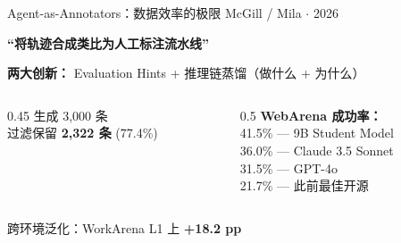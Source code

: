 \documentclass[aspectratio=169, 11pt]{beamer}
\begin{document}
\begin{frame}{Agent-as-Annotators：数据效率的极限}
{\small McGill / Mila $\cdot$ 2026}

\vspace{4pt}
\textbf{``将轨迹合成类比为人工标注流水线''}

\vspace{4pt}
\begin{center}
\end{center}

\vspace{2pt}
\textbf{两大创新：} Evaluation Hints + 推理链蒸馏（做什么 + 为什么）

\vspace{6pt}
\begin{columns}[T]
\begin{column}{0.45\textwidth}
\small
生成 3,000 条\\
过滤保留 \textbf{2,322 条} (77.4\%)
\end{column}
\begin{column}{0.5\textwidth}
\small
\textbf{WebArena 成功率：}\\
\alert{41.5\%} --- 9B Student Model\\
36.0\% --- Claude 3.5 Sonnet\\
31.5\% --- GPT-4o\\
21.7\% --- 此前最佳开源
\end{column}
\end{columns}

\vspace{4pt}
\begin{center}
\small 跨环境泛化：WorkArena L1 上 \textbf{+18.2 pp}
\end{center}
\end{frame}
\end{document}
